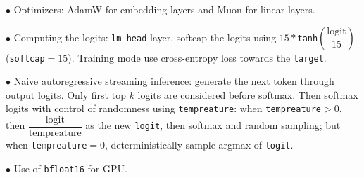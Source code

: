 \documentclass[a4paper,11pt]{article}
\numberwithin{equation}{section}
\begin{document}
$\bullet$ Optimizers: AdamW for embedding layers and Muon for linear layers.

$\bullet$ Computing the logits: \verb#lm_head# layer, softcap the logits using $15*$\verb#tanh#$\left(\dfrac{\text{logit}}{15}\right)$ (\verb#softcap#$=15$). Training mode use cross-entropy loss towards the \verb#target#.

$\bullet$ Naive autoregressive streaming inference: generate the next token through output logits. Only first top $k$ logits are considered before softmax. Then softmax logits with control of randomness using \verb#tempreature#: when \verb#tempreature#$>0$, then $\dfrac{\text{logit}}{\text{tempreature}}$ as the new \verb#logit#, then softmax and random sampling; but when \verb#tempreature#$=0$, deterministically sample argmax of \verb#logit#.

$\bullet$ Use of \verb#bfloat16# for GPU. 
\end{document}

